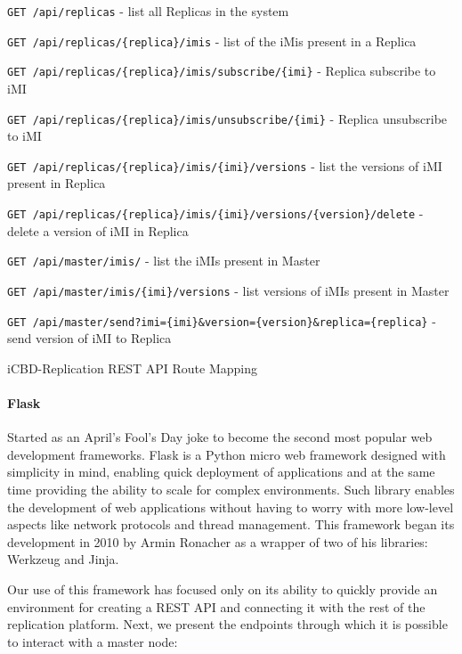 \begin{listing}[ht]
\begin{description}
	\item \texttt{GET /api/replicas} - list all Replicas in the system
	\item \texttt{GET /api/replicas/\{replica\}/imis} - list of the iMis present in a Replica 
	\item \texttt{GET /api/replicas/\{replica\}/imis/subscribe/\{imi\}} - Replica subscribe to iMI 
	\item \texttt{GET /api/replicas/\{replica\}/imis/unsubscribe/\{imi\}} - Replica unsubscribe to iMI 
	\item \texttt{GET /api/replicas/\{replica\}/imis/\{imi\}/versions} - list the versions of iMI present in Replica
	\item \texttt{GET /api/replicas/\{replica\}/imis/\{imi\}/versions/\{version\}/delete} - delete a version of iMI in Replica
	\item \texttt{GET /api/master/imis/} - list the iMIs present in Master
	\item \texttt{GET /api/master/imis/\{imi\}/versions} - list versions of iMIs present in Master
	\item \texttt{GET /api/master/send?imi=\{imi\}\&version=\{version\}\&replica=\{replica\}} - send version of iMI to Replica
\end{description}
\caption{iCBD-Replication REST API Route Mapping}
\label{listing:impl_restapi}
\end{listing}

\paragraph{Flask}
\label{par:impl_flask}

Started as an April's Fool's Day joke to become the second most popular web development frameworks. Flask is a Python micro web framework designed with simplicity in mind, enabling quick deployment of applications and at the same time providing the ability to scale for complex environments. Such library enables the development of web applications without having to worry with more low-level aspects like network protocols and thread management. This framework began its development in 2010 by Armin Ronacher as a wrapper of two of his libraries: Werkzeug and Jinja.

Our use of this framework has focused only on its ability to quickly provide an environment for creating a REST API and connecting it with the rest of the replication platform. 
Next, we present the endpoints through which it is possible to interact with a master node:


